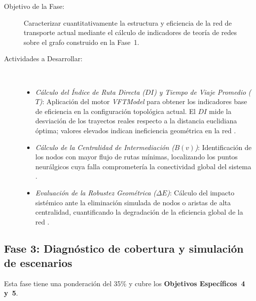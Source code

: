 \begin{description}
    \item[Objetivo de la Fase:] Caracterizar cuantitativamente la estructura y
    eficiencia de la red de transporte actual mediante el cálculo de indicadores
    de teoría de redes sobre el grafo construido en la Fase~1.

    \item[Actividades a Desarrollar:]~
    \begin{itemize}
        \item \textit{Cálculo del Índice de Ruta Directa ($DI$) y Tiempo de Viaje
        Promedio ($T$)}: Aplicación del motor \textit{VFTModel}
        \parencite{cabrera2026VFTModel} para obtener los indicadores base de
        eficiencia en la configuración topológica actual. El $DI$ mide la desviación
        de los trayectos reales respecto a la distancia euclidiana óptima; valores
        elevados indican ineficiencia geométrica en la red \parencite{owais2020}.
        \item \textit{Cálculo de la Centralidad de Intermediación ($B(v)$)}:
        Identificación de los nodos con mayor flujo de rutas mínimas, localizando
        los puntos neurálgicos cuya falla comprometería la conectividad global del
        sistema \parencite{batista2015, loterovélez2014}.
        \item \textit{Evaluación de la Robustez Geométrica ($\Delta E$)}: Cálculo
        del impacto sistémico ante la eliminación simulada de nodos o aristas de alta
        centralidad, cuantificando la degradación de la eficiencia global de la red
        \parencite{loterovélez2014}.
    \end{itemize}
\end{description}

\subsection{Fase 3: Diagnóstico de cobertura y simulación de escenarios}
\label{subsec:fase3}

Esta fase tiene una ponderación del 35\% y cubre los \textbf{Objetivos
Específicos~4 y~5}.

